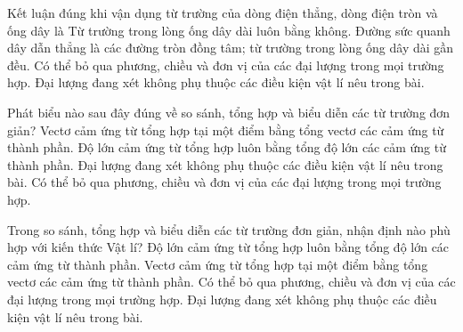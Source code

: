 

\begin{ex}
Kết luận đúng khi vận dụng từ trường của dòng điện thẳng, dòng điện tròn và ống dây là
\choice
{Từ trường trong lòng ống dây dài luôn bằng không.}
{\True Đường sức quanh dây dẫn thẳng là các đường tròn đồng tâm; từ trường trong lòng ống dây dài gần đều.}
{Có thể bỏ qua phương, chiều và đơn vị của các đại lượng trong mọi trường hợp.}
{Đại lượng đang xét không phụ thuộc các điều kiện vật lí nêu trong bài.}
\end{ex}

\begin{ex}
Phát biểu nào sau đây đúng về so sánh, tổng hợp và biểu diễn các từ trường đơn giản?
\choice
{\True Vectơ cảm ứng từ tổng hợp tại một điểm bằng tổng vectơ các cảm ứng từ thành phần.}
{Độ lớn cảm ứng từ tổng hợp luôn bằng tổng độ lớn các cảm ứng từ thành phần.}
{Đại lượng đang xét không phụ thuộc các điều kiện vật lí nêu trong bài.}
{Có thể bỏ qua phương, chiều và đơn vị của các đại lượng trong mọi trường hợp.}
\end{ex}

\begin{ex}
Trong so sánh, tổng hợp và biểu diễn các từ trường đơn giản, nhận định nào phù hợp với kiến thức Vật lí?
\choice
{Độ lớn cảm ứng từ tổng hợp luôn bằng tổng độ lớn các cảm ứng từ thành phần.}
{\True Vectơ cảm ứng từ tổng hợp tại một điểm bằng tổng vectơ các cảm ứng từ thành phần.}
{Có thể bỏ qua phương, chiều và đơn vị của các đại lượng trong mọi trường hợp.}
{Đại lượng đang xét không phụ thuộc các điều kiện vật lí nêu trong bài.}
\end{ex}

